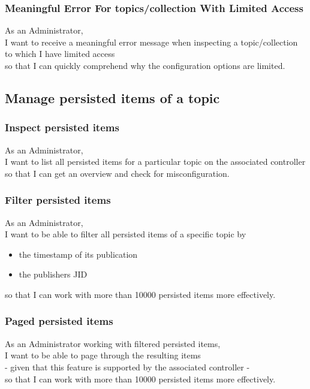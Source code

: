\subsubsection{Meaningful Error For topics/collection With Limited Access}

As an Administrator,\\
I want to receive a meaningful error message when inspecting a topic/collection to which I have limited access \\
so that I can quickly comprehend why the configuration options are limited.

\subsection{Manage persisted items of a topic}\label{sec:manage-persisted-items}
\subsubsection{Inspect persisted items}

As an Administrator,\\
I want to list all persisted items for a particular topic on the associated controller \\
so that I can get an overview and check for misconfiguration.

\subsubsection{Filter persisted items}\label{sec:requirement-filter-persisted-items}

As an Administrator,\\
I want to be able to filter all persisted items of a specific topic by \\
\begin{itemize}
    \item the timestamp of its publication
    \item the publishers JID
\end{itemize}
so that I can work with more than 10000 persisted items more effectively.

\subsubsection{Paged persisted items}\label{sec:paged-persisted-items}
As an Administrator working with filtered persisted items,\\
I want to be able to page through the resulting items\\
- given that this feature is supported by the associated controller -\\
so that I can work with more than 10000 persisted items more effectively.

